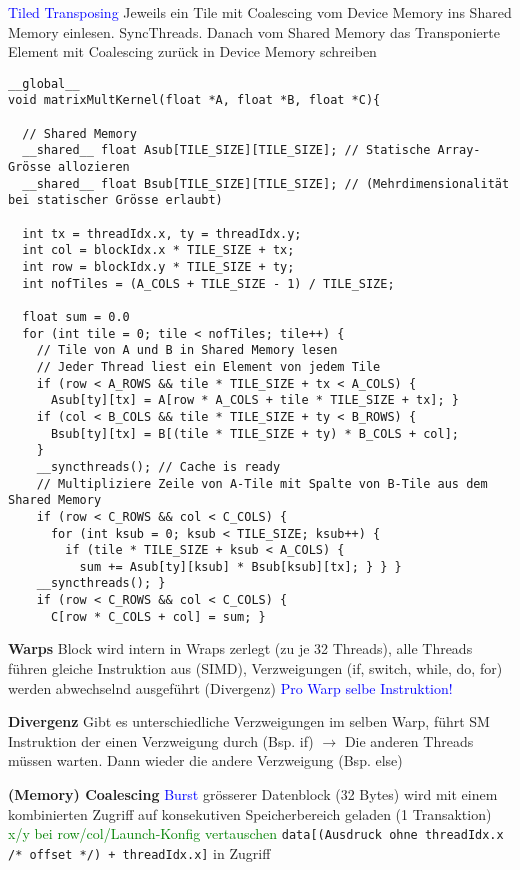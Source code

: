\textcolor{blue}{Tiled Transposing} Jeweils ein Tile mit Coalescing vom Device Memory ins Shared Memory einlesen. SyncThreads. Danach vom Shared Memory das Transponierte Element mit Coalescing zurück in Device Memory schreiben

\begin{lstlisting}
__global__
void matrixMultKernel(float *A, float *B, float *C){

  // Shared Memory
  __shared__ float Asub[TILE_SIZE][TILE_SIZE]; // Statische Array-Grösse allozieren
  __shared__ float Bsub[TILE_SIZE][TILE_SIZE]; // (Mehrdimensionalität bei statischer Grösse erlaubt)

  int tx = threadIdx.x, ty = threadIdx.y;
  int col = blockIdx.x * TILE_SIZE + tx;
  int row = blockIdx.y * TILE_SIZE + ty;
  int nofTiles = (A_COLS + TILE_SIZE - 1) / TILE_SIZE;

  float sum = 0.0
  for (int tile = 0; tile < nofTiles; tile++) {
    // Tile von A und B in Shared Memory lesen
    // Jeder Thread liest ein Element von jedem Tile
    if (row < A_ROWS && tile * TILE_SIZE + tx < A_COLS) {
      Asub[ty][tx] = A[row * A_COLS + tile * TILE_SIZE + tx]; }
    if (col < B_COLS && tile * TILE_SIZE + ty < B_ROWS) {
      Bsub[ty][tx] = B[(tile * TILE_SIZE + ty) * B_COLS + col];
    }
    __syncthreads(); // Cache is ready
    // Multipliziere Zeile von A-Tile mit Spalte von B-Tile aus dem Shared Memory
    if (row < C_ROWS && col < C_COLS) {
      for (int ksub = 0; ksub < TILE_SIZE; ksub++) {
        if (tile * TILE_SIZE + ksub < A_COLS) {
          sum += Asub[ty][ksub] * Bsub[ksub][tx]; } } }
    __syncthreads(); }
    if (row < C_ROWS && col < C_COLS) {
      C[row * C_COLS + col] = sum; }
\end{lstlisting}


\textbf{Warps}
Block wird intern in Wraps zerlegt (zu je 32 Threads), alle Threads führen gleiche Instruktion aus (SIMD), Verzweigungen (if, switch, while, do, for) werden abwechselnd ausgeführt (Divergenz) \textcolor{blue}{Pro Warp selbe Instruktion!}

\textbf{Divergenz}
Gibt es unterschiedliche Verzweigungen im selben Warp, führt SM Instruktion der einen Verzweigung durch (Bsp. if) $\rightarrow$ Die anderen Threads müssen warten. Dann wieder die andere Verzweigung (Bsp. else)


\textbf{(Memory) Coalescing} \textcolor{blue}{Burst} grösserer Datenblock (32 Bytes) wird mit einem kombinierten Zugriff auf konsekutiven Speicherbereich geladen (1 Transaktion) \textcolor{green}{x/y bei row/col/Launch-Konfig vertauschen} \lstinline{data[(Ausdruck ohne threadIdx.x /* offset */) + threadIdx.x]} in Zugriff
